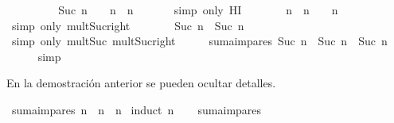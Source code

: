 \begin{isabellebody}
\ \ \isamarkupfalse%
\ \isamarkupfalse%
\ {\isachardoublequoteopen}{\isasymdots}\ {\isacharequal}\ {\isacharparenleft}{}\ {\isacharasterisk}\ {\isacharparenleft}Suc\ n{\isacharparenright}\ {\isacharminus}\ {}{\isacharparenright}\ {\isacharplus}\ n\ {\isacharasterisk}\ n{\isachardoublequoteclose}\ \isanewline
\ \ \ \ \isamarkupfalse%
\ {\isacharparenleft}simp\ only{\isacharcolon}\ HI{\isacharparenright}\isanewline
\ \ \isamarkupfalse%
\ \isamarkupfalse%
\ {\isachardoublequoteopen}{\isasymdots}\ {\isacharequal}\ n\ {\isacharasterisk}\ n\ {\isacharplus}\ {}\ {\isacharasterisk}\ n\ {\isacharplus}\ {}{\isachardoublequoteclose}\ \isanewline
\ \ \ \ \isamarkupfalse%
\ {\isacharparenleft}simp\ only{\isacharcolon}\ mult{\isacharunderscore}Suc{\isacharunderscore}right{\isacharparenright}\isanewline
\ \ \isamarkupfalse%
\ \isamarkupfalse%
\ {\isachardoublequoteopen}{\isasymdots}\ {\isacharequal}\ {\isacharparenleft}Suc\ n{\isacharparenright}\ {\isacharasterisk}\ {\isacharparenleft}Suc\ n{\isacharparenright}{\isachardoublequoteclose}\isanewline
\ \ \ \ \isamarkupfalse%
\ {\isacharparenleft}simp\ only{\isacharcolon}\ mult{\isacharunderscore}Suc\ mult{\isacharunderscore}Suc{\isacharunderscore}right{\isacharparenright}\isanewline
\ \ \isamarkupfalse%
\ \isamarkupfalse%
\ {\isachardoublequoteopen}suma{\isacharunderscore}impares\ {\isacharparenleft}Suc\ n{\isacharparenright}\ {\isacharequal}\ {\isacharparenleft}Suc\ n{\isacharparenright}\ {\isacharasterisk}\ {\isacharparenleft}Suc\ n{\isacharparenright}{\isachardoublequoteclose}\ \isanewline
\ \ \ \ \isamarkupfalse%
\ simp\isanewline
{}\isamarkupfalse%
%
\endisatagproof
{\isafoldproof}%
%
\isadelimproof
%
\endisadelimproof
%
\begin{isamarkuptext}%
En la demostración anterior se pueden ocultar detalles.%
\end{isamarkuptext}\isamarkuptrue%
\isamarkupfalse%
\ {\isachardoublequoteopen}suma{\isacharunderscore}impares\ n\ {\isacharequal}\ n\ {\isacharasterisk}\ n{\isachardoublequoteclose}\isanewline
%
\isadelimproof
%
\endisadelimproof
%
\isatagproof
{}\isamarkupfalse%
\ {\isacharparenleft}induct\ n{\isacharparenright}\isanewline
\ \ \isamarkupfalse%
\ {\isachardoublequoteopen}suma{\isacharunderscore}impares\ {}\ {\isacharequal}\ {}\ {\isacharasterisk}\ {}{\isachardoublequoteclose}\ \isamarkupfalse%

\end{isabellebody}
